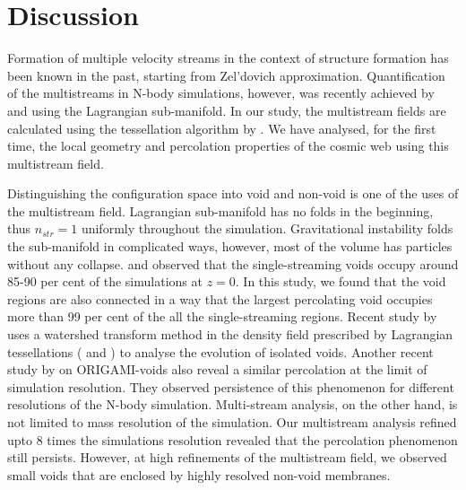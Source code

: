 \section{Discussion}
\label{sec:discussion}


Formation of multiple velocity streams in the context of structure formation has been known in the past, starting from Zel'dovich approximation. Quantification of the multistreams in N-body simulations, however, was recently achieved by \cite{Shandarin2012} and \cite{Abel2012} using the Lagrangian sub-manifold. In our study, the multistream fields are calculated using the tessellation algorithm by \cite{Shandarin2012}. We have analysed, for the first time, the local geometry and percolation properties of the cosmic web using this multistream field.   

Distinguishing the configuration space into void and non-void is one of the uses of the multistream field. Lagrangian sub-manifold has no folds in the beginning, thus $n_{str} = 1$ uniformly throughout the simulation. Gravitational instability folds the sub-manifold in complicated ways, however, most of the volume has particles without any collapse. \cite{Shandarin2012} and \cite{Ramachandra2015} observed that the single-streaming voids occupy around 85-90 per cent of the simulations at $z=0$. In this study, we found that the void regions are also connected in a way that the largest percolating void occupies more than 99 per cent of the all the single-streaming regions. Recent study by \cite{Wojtak2016a} uses a watershed transform method in the density field prescribed by Lagrangian tessellations (\citealt{Shandarin2012} and \citealt{Abel2012}) to analyse the evolution of isolated voids. Another recent study by \cite{Falck2015} on ORIGAMI-voids also reveal a similar percolation at the limit of simulation resolution. They observed persistence of this phenomenon for different resolutions of the N-body simulation. Multi-stream analysis, on the other hand, is not limited to mass resolution of the simulation. Our multistream analysis refined upto 8 times the simulations resolution revealed that the percolation phenomenon still persists. However, at high refinements of the multistream field, we observed small voids that are enclosed by highly resolved non-void membranes. 


